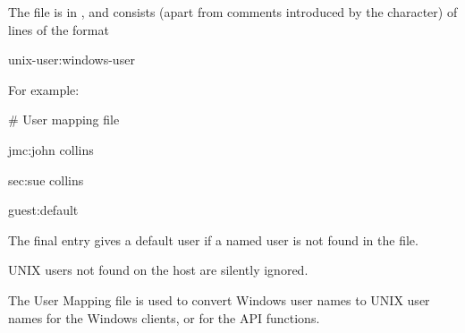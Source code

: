 The file is in \usermap, and consists (apart from comments introduced by the \filename{\#} character) of lines of the format

\begin{expara}

unix-user:windows-user

\end{expara}

For example:

\begin{expara}

\# User mapping file

jmc:john collins

sec:sue collins

guest:default

\end{expara}

The final entry gives a default user if a named user is not found in the file.

UNIX users not found on the host are silently ignored.

The User Mapping file is used to convert Windows user names to UNIX user names for the Windows clients, or for the API functions.

